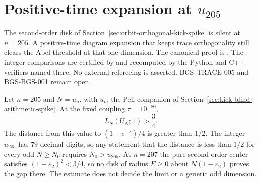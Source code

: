 \section{Positive-time expansion at \(u_{205}\)}
\label{sec:positive-time-spike}
The second-order disk of Section~\ref{sec:orbit-orthogonal-kick-spike}
is silent at \(n=205\). A positive-time diagram expansion that keeps
trace orthogonality still clears the Abel threshold at that one dimension.
The canonical proof is
.
The integer comparisons are certified by
 and recomputed by the
Python and C++ verifiers named there. No external refereeing is asserted.
BGS-TRACE-005 and BGS-BGS-001 remain open.

\begin{theorem}
\label{thm:positive-time-spike}
Let \(n=205\) and \(N=u_n\), with \(u_m\) the Pell companion of
Section~\ref{sec:kick-blind-arithmetic-spike}. At the fixed coupling
\(\tau=10^{-80}\),
\[
 L_N(U_N;1)>\frac34.
\]
The distance from this value to \((1-e^{-2})/4\) is greater than \(1/2\).
The integer \(u_{205}\) has \(79\) decimal digits, so any statement that the
distance is less than \(1/2\) for every odd \(N\ge N_0\) requires
\(N_0>u_{205}\). At \(n=207\) the pure second-order center satisfies
\((1-\varepsilon_2)^2<3/4\), so no disk of radius \(E\ge0\) about
\(N(1-\varepsilon_2)\) proves the gap there. The estimate does not decide
the limit or a generic odd dimension.
\end{theorem}
